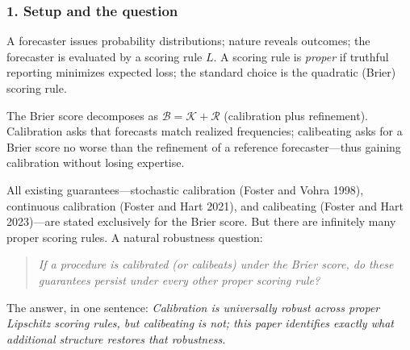 

\subsubsection*{1. Setup and the question}

A forecaster issues probability distributions; nature reveals outcomes;
the forecaster is evaluated by a scoring rule $L$.  A scoring rule is
\emph{proper} if truthful reporting minimizes expected loss; the
standard choice is the quadratic (Brier) scoring rule.

The Brier score decomposes as $\mathcal{B} = \mathcal{K} + \mathcal{R}$
(calibration plus refinement).  Calibration asks that forecasts match
realized frequencies; calibeating asks for a Brier score no worse than
the refinement of a reference forecaster---thus gaining calibration
without losing expertise.

All existing guarantees---stochastic calibration (Foster and Vohra
1998), continuous calibration (Foster and Hart 2021), and calibeating
(Foster and Hart 2023)---are stated exclusively for the Brier score.
But there are infinitely many proper scoring rules.  A natural
robustness question:

\medskip
\begin{quote}
\emph{If a procedure is calibrated (or calibeats) under the Brier
score, do these guarantees persist under every other proper scoring
rule?}
\end{quote}

\medskip\noindent
The answer, in one sentence:
\emph{Calibration is universally robust across proper Lipschitz scoring
rules, but calibeating is not; this paper identifies exactly what
additional structure restores that robustness.}

